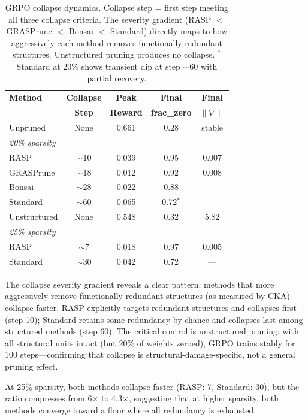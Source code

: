 \documentclass[11pt,a4paper]{article}
\begin{document}
\begin{table}[t]
\centering
\small
\begin{tabular}{lcccc}
\toprule
\textbf{Method} & \textbf{Collapse} & \textbf{Peak} & \textbf{Final} & \textbf{Final} \\
& \textbf{Step} & \textbf{Reward} & \textbf{frac\_zero} & \textbf{$\|\nabla\|$} \\
\midrule
Unpruned & None & 0.661 & 0.28 & stable \\
\midrule
\multicolumn{5}{l}{\textit{20\% sparsity}} \\
RASP & $\sim$10 & 0.039 & 0.95 & 0.007 \\
GRASPrune & $\sim$18 & 0.012 & 0.92 & 0.008 \\
Bonsai & $\sim$28 & 0.022 & 0.88 & --- \\
Standard & $\sim$60 & 0.065 & 0.72$^*$ & --- \\
Unstructured & None & 0.548 & 0.32 & 5.82 \\
\midrule
\multicolumn{5}{l}{\textit{25\% sparsity}} \\
RASP & $\sim$7 & 0.018 & 0.97 & 0.005 \\
Standard & $\sim$30 & 0.042 & 0.72 & --- \\
\bottomrule
\end{tabular}
\caption{GRPO collapse dynamics. Collapse step = first step meeting all three collapse criteria. The severity gradient (RASP $<$ GRASPrune $<$ Bonsai $<$ Standard) directly maps to how aggressively each method removes functionally redundant structures. Unstructured pruning produces no collapse. $^*$Standard at 20\% shows transient dip at step $\sim$60 with partial recovery.}
\label{tab:collapse}
\end{table}

The collapse severity gradient reveals a clear pattern: methods that more aggressively remove functionally redundant structures (as measured by CKA) collapse faster. RASP explicitly targets redundant structures and collapses first (step 10); Standard retains some redundancy by chance and collapses last among structured methods (step 60). The critical control is unstructured pruning: with all structural units intact (but 20\% of weights zeroed), GRPO trains stably for 100 steps---confirming that collapse is structural-damage-specific, not a general pruning effect.

At 25\% sparsity, both methods collapse faster (RASP: 7, Standard: 30), but the ratio compresses from 6$\times$ to 4.3$\times$, suggesting that at higher sparsity, both methods converge toward a floor where all redundancy is exhausted.
\end{document}
